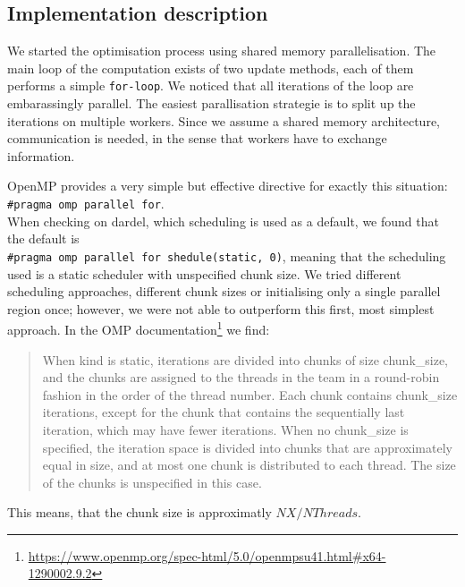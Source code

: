 \documentclass[a4paper,10pt]{article}
\begin{document}
\subsection{Implementation description}
We started the optimisation process using shared memory parallelisation.
The main loop of the computation exists of two update methods, each of them performs a simple \verb|for-loop|.
We noticed that all iterations of the loop are embarassingly parallel.
The easiest parallisation strategie is to split up the iterations on multiple workers.
Since we assume a shared memory architecture, communication is needed, in the sense that workers have to exchange information.

OpenMP provides a very simple but effective directive for exactly this situation: \verb|#pragma omp parallel for|.\\
When checking on dardel, which scheduling is used as a default, we found that the default is\\
\verb|#pragma omp parallel for shedule(static, 0)|, meaning that the scheduling used is a static scheduler with unspecified chunk size.
We tried different scheduling approaches, different chunk sizes or initialising only a single parallel region once; however, we were not able to outperform this first, most simplest approach.
In the OMP documentation\footnote{\url{https://www.openmp.org/spec-html/5.0/openmpsu41.html\#x64-1290002.9.2}} we find:

\begin{quote}
When kind is static, iterations are divided into chunks of size chunk\_size, and the chunks are assigned to the threads in the team in a round-robin fashion in the order of the thread number. Each chunk contains chunk\_size iterations, except for the chunk that contains the sequentially last iteration, which may have fewer iterations.
When no chunk\_size is specified, the iteration space is divided into chunks that are approximately equal in size, and at most one chunk is distributed to each thread. The size of the chunks is unspecified in this case.
\end{quote}
This means, that the chunk size is approximatly $NX / NThreads$.
\end{document}
